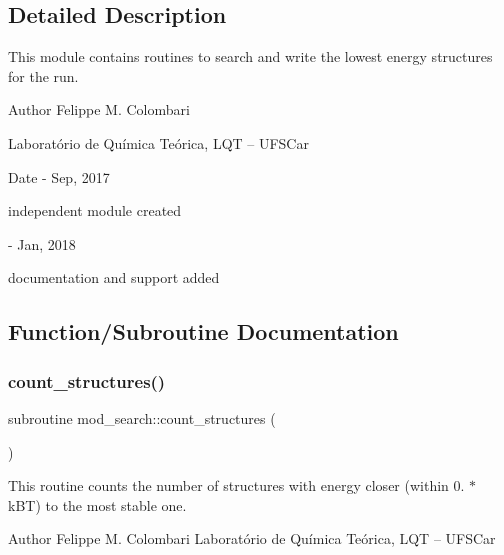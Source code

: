 \subsection{Detailed Description}
This module contains routines to search and write the lowest energy structures for the run. 

\begin{DoxyAuthor}{Author}
Felippe M. Colombari
\begin{DoxyItemize}
\item Laboratório de Química Teórica, L\+QT -- U\+F\+S\+Car 
\end{DoxyItemize}
\end{DoxyAuthor}
\begin{DoxyDate}{Date}
-\/ Sep, 2017
\begin{DoxyItemize}
\item independent module created 
\end{DoxyItemize}

-\/ Jan, 2018
\begin{DoxyItemize}
\item documentation and support added 
\end{DoxyItemize}
\end{DoxyDate}


\subsection{Function/\+Subroutine Documentation}
\mbox{\label{namespacemod__search_a5026804a4e265b1a450eebc86cd81575}} 
\subsubsection{\texorpdfstring{count\+\_\+structures()}{count\_structures()}}
{\footnotesize\ttfamily subroutine mod\+\_\+search\+::count\+\_\+structures (\begin{DoxyParamCaption}{ }\end{DoxyParamCaption})}



This routine counts the number of structures with energy closer (within 0. $\ast$ k\+BT) to the most stable one. 

\begin{DoxyAuthor}{Author}
Felippe M. Colombari Laboratório de Química Teórica, L\+QT -- U\+F\+S\+Car 
\end{DoxyAuthor}


